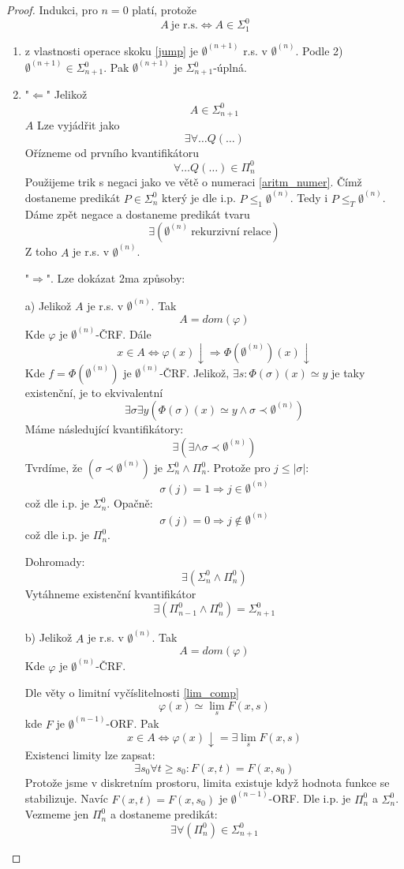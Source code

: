 \begin{proof}
	Indukci, pro $n = 0$ platí, protože
	\[ A\ \text{je r.s.} \iff A \in \Sigma_1^0 \]
	\begin{enumerate}
		\item z vlastnosti operace skoku \cref{jump} je $\emptyset^{(n + 1)}$ r.s. v $\emptyset^{(n)}$.
			Podle 2) $\emptyset^{(n + 1)} \in \Sigma_{n + 1}^0$.
			Pak $\emptyset^{(n + 1)}$ je $\Sigma_{n + 1}^0$-úplná.
		\item "$\Leftarrow$" Jelikož
			\[ A \in \Sigma_{n + 1}^0 \]
			$A$ Lze vyjádřit jako
			\[ \exists \forall \ldots Q(\ldots) \]
			Ořízneme od prvního kvantifikátoru
			\[ \forall \ldots Q(\ldots) \in \Pi_n^0 \]
			Použijeme trik s negaci jako ve větě o numeraci \cref{aritm_numer}.
			Čímž dostaneme predikát $P \in \Sigma_{n}^0$ který je dle i.p. $P \leq_1 \emptyset^{(n)}$.
			Tedy i $P \leq_T \emptyset^{(n)}$.
			Dáme zpět negace a dostaneme predikát tvaru
			\[ \exists (\emptyset^{(n)}\ \text{rekurzivní relace}) \]
			Z toho $A$ je r.s. v $\emptyset^{(n)}$.

		"$\Rightarrow$". Lze dokázat 2ma způsoby:

			a) Jelikož $A$ je r.s. v $\emptyset^{(n)}$. Tak
			\[ A = dom(\varphi) \]
			Kde $\varphi$ je $\emptyset^{(n)}$-ČRF.
			Dále
			\[ x \in A \iff \varphi(x) \downarrow \Rightarrow \Phi(\emptyset^{(n)})(x) \downarrow \]
			Kde $f = \Phi(\emptyset^{(n)})$ je $\emptyset^{(n)}$-ČRF.
			Jelikož, $\exists s:\Phi(\sigma)(x) \simeq y$ je taky existenční, je to ekvivalentní
			\[ \exists \sigma \exists y(\Phi(\sigma)(x) \simeq y \land \sigma \prec \emptyset^{(n)}) \]
			Máme následující kvantifikátory:
			\[ \exists (\exists \land \sigma \prec \emptyset^{(n)}) \]
			Tvrdíme, že $(\sigma \prec \emptyset^{(n)})$ je $\Sigma_n^0 \land \Pi_n^0$.
			Protože pro $j \leq |\sigma|$:
			\[ \sigma(j) = 1 \Rightarrow j \in \emptyset^{(n)} \]
			což dle i.p. je $\Sigma_n^0$.
			Opačně:
			\[ \sigma(j) = 0 \Rightarrow j \notin \emptyset^{(n)} \]
			což dle i.p. je $\Pi_n^0$.

			Dohromady:
			\[ \exists(\Sigma_n^0 \land \Pi_n^0)\]
			Vytáhneme existenční kvantifikátor
			\[\exists(\Pi_{n - 1}^0 \land \Pi_n^0) = \Sigma_{n + 1}^0 \]

			b) Jelikož $A$ je r.s. v $\emptyset^{(n)}$. Tak
			\[ A = dom(\varphi) \]
			Kde $\varphi$ je $\emptyset^{(n)}$-ČRF.

			Dle věty o limitní vyčíslitelnosti \cref{lim_comp}
			\[ \varphi(x) \simeq \lim_s F(x, s) \]
			kde $F$ je $\emptyset^{(n - 1)}$-ORF. Pak
			\[ x \in A \iff \varphi(x) \downarrow = \exists \lim_s F(x, s) \]
			Existenci limity lze zapsat:
			\[ \exists s_0 \forall t \geq s_0: F(x, t) = F(x, s_0) \]
			Protože jsme v diskretním prostoru, limita existuje když hodnota funkce se stabilizuje.
			Navíc $F(x, t) = F(x, s_0)$ je $\emptyset^{(n - 1)}$-ORF.
			Dle i.p. je $\Pi_n^0$ a $\Sigma_n^0$.
			Vezmeme jen $\Pi_n^0$ a dostaneme predikát:
			\[ \exists \forall(\Pi_n^0) \in \Sigma_{n + 1}^0 \]


\end{enumerate}
\end{proof}
